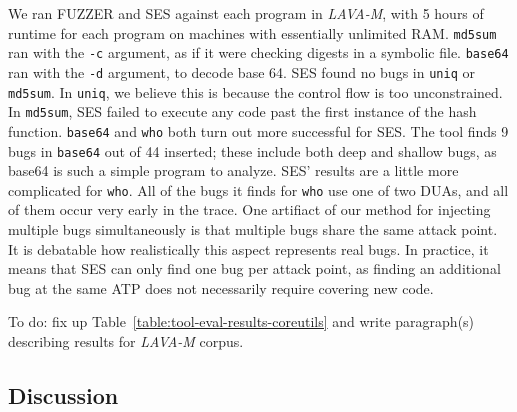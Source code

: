 We ran FUZZER and SES against each program in \emph{LAVA-M}, with 5 hours of runtime for each program on machines with essentially unlimited RAM.
\verb+md5sum+ ran with the \verb+-c+ argument, as if it were checking digests in a symbolic file.
\verb+base64+ ran with the \verb+-d+ argument, to decode base 64.
SES found no bugs in \verb+uniq+ or \verb+md5sum+.
In \verb+uniq+, we believe this is because the control flow is too unconstrained.
In \verb+md5sum+, SES failed to execute any code past the first instance of the hash function.
\verb+base64+ and \verb+who+ both turn out more successful for SES.
The tool finds 9 bugs in \verb+base64+ out of 44 inserted; these include both deep and shallow bugs, as base64 is such a simple program to analyze.
SES' results are a little more complicated for \verb+who+.
All of the bugs it finds for \verb+who+ use one of two DUAs, and all of them occur very early in the trace.
One artifiact of our method for injecting multiple bugs simultaneously is that multiple bugs share the same attack point.
It is debatable how realistically this aspect represents real bugs.
In practice, it means that SES can only find one bug per attack point, as finding an additional bug at the same ATP does not necessarily require covering new code.

To do: fix up Table~\ref{table:tool-eval-results-coreutils} and write paragraph(s) describing results for \emph{LAVA-M} corpus.



\subsection*{Discussion}
